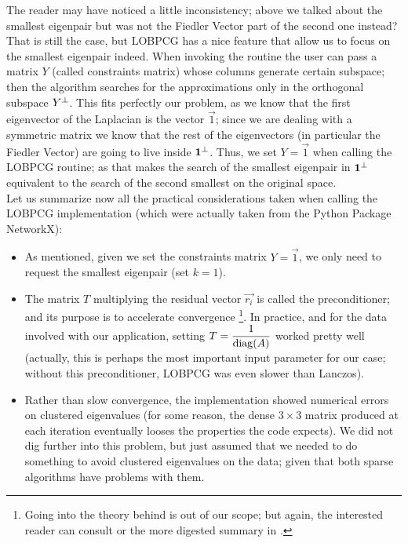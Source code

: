 The reader may have noticed a little inconsistency; above we talked about
the smallest eigenpair but was not the Fiedler Vector part of the
second one instead? That is still the case, but LOBPCG has a nice
feature that allow us to focus on the smallest eigenpair indeed. When
invoking the routine the user can pass a matrix $Y$ (called
constraints matrix) whose columns
generate certain subspace; then the algorithm searches for the
approximations only in the orthogonal subspace ${Y}^{\bot}$. This fits
perfectly our problem, as we know that the first eigenvector of the
Laplacian is the vector $\vec{1}$; since we are dealing with a
symmetric matrix we know that the rest of the eigenvectors (in
particular the Fiedler Vector) are going to live inside
${\mathbf{1}}^{\bot}$. Thus, we set $Y = \vec{1}$ when calling the LOBPCG
routine; as that makes the search of the smallest eigenpair in
${\mathbf{1}}^{\bot}$ equivalent to the search of the second smallest on
the original space. \\

Let us summarize now all the practical considerations taken when
calling the LOBPCG implementation (which were actually taken from the
Python Package NetworkX):

\begin{itemize}
\item As mentioned, given we set the constraints matrix $Y = \vec{1}$,
  we only need to request the smallest eigenpair (set $k=1$). 
\item The matrix $T$ multiplying the residual vector $\vec{r_i}$ is called
  the preconditioner; and its purpose is to accelerate
  convergence \footnote{Going into the theory behind is out of
    our scope; but again,  the interested reader can consult \cite{knyazev01}
    or the more digested summary in \cite{lashuk07}.}. In practice, and for the
  data involved with our application, setting $T =
  \dfrac{1}{\operatorname{diag}(A)}$ worked pretty well (actually, this is
  perhaps the most important input parameter for our case; without
  this preconditioner, LOBPCG was even slower than Lanczos). 
\item Rather than slow convergence, the implementation showed
  numerical errors on clustered eigenvalues (for some reason, the
  dense $3 \times 3$ matrix produced at each iteration eventually
  looses the properties the code expects). We did not dig further into
  this problem, but just assumed that we needed to do something to
  avoid clustered eigenvalues on the data; given that both sparse
  algorithms have problems with them.
\end{itemize}

